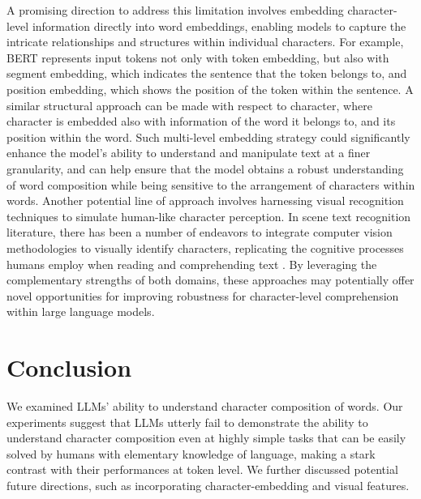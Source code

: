 \documentclass{article}
\theoremstyle{plain}
\theoremstyle{definition}
\theoremstyle{remark}
\begin{document}
A promising direction to address this limitation involves embedding character-level information directly into word embeddings, enabling models to capture the intricate relationships and structures within individual characters. For example, BERT \cite{Devlin2019BERTPO} represents input tokens not only with token embedding, but also with segment embedding, which indicates the sentence that the token belongs to, and position embedding, which shows the position of the token within the sentence. A similar structural approach can be made with respect to character, where character is embedded also with information of the word it belongs to, and its position within the word. Such multi-level embedding strategy could significantly enhance the model's ability to understand and manipulate text at a finer granularity, and can help ensure that the model obtains a robust understanding of word composition while being sensitive to the arrangement of characters within words. Another potential line of approach involves harnessing visual recognition techniques to simulate human-like character perception. In scene text recognition literature, there has been a number of endeavors to integrate computer vision methodologies to visually identify characters, replicating the cognitive processes humans employ when reading and comprehending text \cite{Du2022SVTRST,Bartz2017SEETS}.  By leveraging the complementary strengths of both domains, these approaches may potentially offer novel opportunities for improving robustness for character-level comprehension within large language models. %









\section{Conclusion}
We examined LLMs' ability to understand character composition of words. Our experiments suggest that LLMs utterly fail to demonstrate the ability to understand character composition even at highly simple tasks that can be easily solved by humans with elementary knowledge of language, making a stark contrast with their performances at token level. We further discussed potential future directions, such as incorporating character-embedding and visual features.
\end{document}
